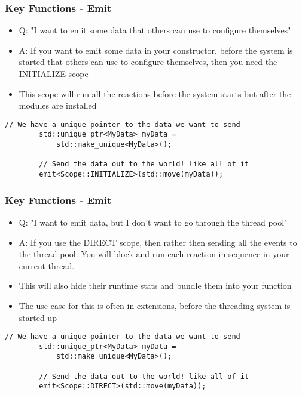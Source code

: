 \documentclass{beamer}
\begin{document}
\begin{frame}[fragile]
	\frametitle{Key Functions - Emit}
	\begin{itemize}
		\item Q: "I want to emit some data that others can use to configure themselves"
		\item A: If you want to emit some data in your constructor, before the system is started that others can use to configure themselves, then you need the INITIALIZE scope
		\item This scope will run all the reactions before the system starts but after the modules are installed
	\end{itemize}

	\begin{lstlisting}[language=nuclear]
		// We have a unique pointer to the data we want to send
		std::unique_ptr<MyData> myData =
		    std::make_unique<MyData>();

		// Send the data out to the world! like all of it
		emit<Scope::INITIALIZE>(std::move(myData));
	\end{lstlisting}
\end{frame}

\begin{frame}[fragile]
	\frametitle{Key Functions - Emit}
	\begin{itemize}
		\item Q: "I want to emit data, but I don't want to go through the thread pool"
		\item A: If you use the DIRECT scope, then rather then sending all the events to the thread pool. You will block and run each reaction in sequence in your current thread.
		\item This will also hide their runtime stats and bundle them into your function
		\item The use case for this is often in extensions, before the threading system is started up
	\end{itemize}

	\begin{lstlisting}[language=nuclear]
		// We have a unique pointer to the data we want to send
		std::unique_ptr<MyData> myData =
		    std::make_unique<MyData>();

		// Send the data out to the world! like all of it
		emit<Scope::DIRECT>(std::move(myData));
	\end{lstlisting}
\end{frame}
\end{document}
